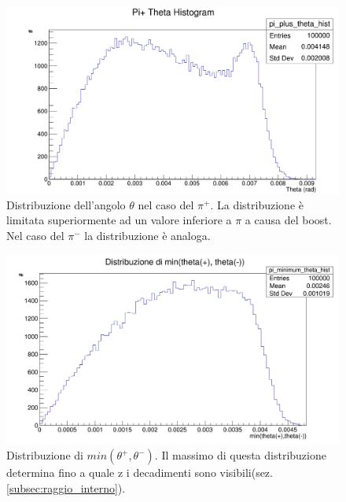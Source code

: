 \documentclass[8pt]{extarticle}
\begin{document}
\begin{figure}
	\begin{center}
		\includegraphics[scale=0.3]{gen_theta} 
		\caption{Distribuzione dell'angolo $\theta$ nel caso del $\pi^+$. La distribuzione è limitata superiormente ad un valore inferiore a $\pi$ a causa del boost. Nel caso del $\pi^-$ la distribuzione è analoga.}
		\label{fig:gen_theta}
	\end{center}
\end{figure}

\begin{figure}
	\begin{center}
		\includegraphics[scale=0.3]{gen_mintheta} 
		\caption{Distribuzione di $min(\theta^+, \theta^-)$. Il massimo di questa distribuzione determina fino a quale z i decadimenti sono visibili(sez.\ref{subsec:raggio_interno}).}
		\label{fig:gen_mintheta}
	\end{center}
\end{figure}
\end{document}
